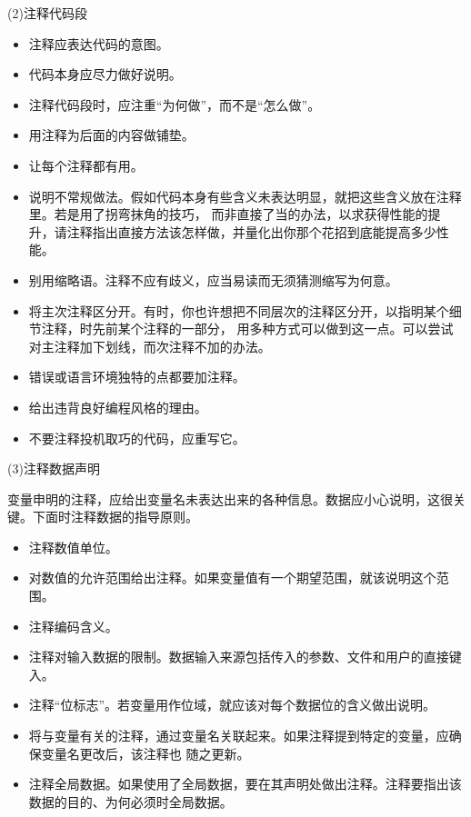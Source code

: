 \documentclass{article}
\begin{document}
\par
(2)注释代码段
\par
\begin{itemize}
    \item 注释应表达代码的意图。
    \item 代码本身应尽力做好说明。
    \item 注释代码段时，应注重“为何做”，而不是“怎么做”。
    \item 用注释为后面的内容做铺垫。
    \item 让每个注释都有用。
    \item 说明不常规做法。假如代码本身有些含义未表达明显，就把这些含义放在注释里。若是用了拐弯抹角的技巧，
    而非直接了当的办法，以求获得性能的提升，请注释指出直接方法该怎样做，并量化出你那个花招到底能提高多少性能。
    \item 别用缩略语。注释不应有歧义，应当易读而无须猜测缩写为何意。
    \item 将主次注释区分开。有时，你也许想把不同层次的注释区分开，以指明某个细节注释，时先前某个注释的一部分，
    用多种方式可以做到这一点。可以尝试对主注释加下划线，而次注释不加的办法。
    \item 错误或语言环境独特的点都要加注释。
    \item 给出违背良好编程风格的理由。
    \item 不要注释投机取巧的代码，应重写它。
\end{itemize}

\par
(3)注释数据声明
\par
变量申明的注释，应给出变量名未表达出来的各种信息。数据应小心说明，这很关键。下面时注释数据的指导原则。
\begin{itemize}
    \item 注释数值单位。
    \item 对数值的允许范围给出注释。如果变量值有一个期望范围，就该说明这个范围。
    \item 注释编码含义。
    \item 注释对输入数据的限制。数据输入来源包括传入的参数、文件和用户的直接键入。
    \item 注释“位标志”。若变量用作位域，就应该对每个数据位的含义做出说明。
    \item 将与变量有关的注释，通过变量名关联起来。如果注释提到特定的变量，应确保变量名更改后，该注释也
    随之更新。
    \item 注释全局数据。如果使用了全局数据，要在其声明处做出注释。注释要指出该数据的目的、为何必须时全局数据。
\end{itemize}
\end{document}
